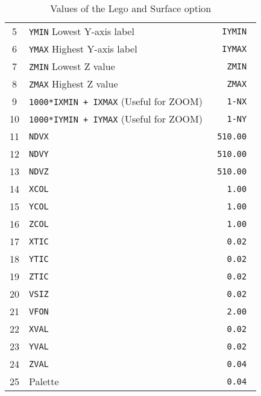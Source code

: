 \begin{table}[p]
\begin{center}
\begin{tabular}{||c|p{}|>{\tt}r||}
5  & {\tt YMIN} Lowest Y-axis label                                 &   IYMIN \\
6  & {\tt YMAX} Highest Y-axis label                                &   IYMAX \\
7  & {\tt ZMIN} Lowest Z value                                      &   ZMIN  \\
8  & {\tt ZMAX} Highest Z value                                     &   ZMAX  \\
9  & {\tt 1000*IXMIN + IXMAX} (Useful for ZOOM)                     &   1-NX  \\
10 & {\tt 1000*IYMIN + IYMAX} (Useful for ZOOM)                     &   1-NY  \\
11 & {\tt NDVX}                                                     &  510.00 \\
12 & {\tt NDVY}                                                     &  510.00 \\
13 & {\tt NDVZ}                                                     &  510.00 \\
14 & {\tt XCOL}                                                     &    1.00 \\
15 & {\tt YCOL}                                                     &    1.00 \\
16 & {\tt ZCOL}                                                     &    1.00 \\
17 & {\tt XTIC}                                                     &    0.02 \\
18 & {\tt YTIC}                                                     &    0.02 \\
19 & {\tt ZTIC}                                                     &    0.02 \\
20 & {\tt VSIZ}                                                     &    0.02 \\
21 & {\tt VFON}                                                     &    2.00 \\
22 & {\tt XVAL}                                                     &    0.02 \\
23 & {\tt YVAL}                                                     &    0.02 \\
24 & {\tt ZVAL}                                                     &    0.04 \\
25 & Palette                                                        &    0.04 \\
\hline
\end{tabular}
\end{center}
\caption{Values of the \protect{} Lego and Surface option}
\label{tab-IGTABLS}
\end{table}

